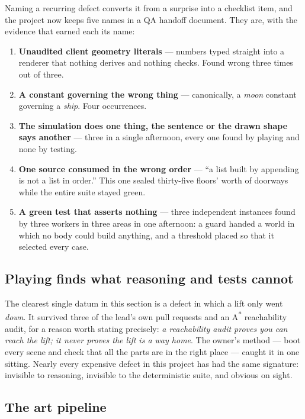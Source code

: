 \documentclass[10pt,twocolumn]{article}
\begin{document}
Naming a recurring defect converts it from a surprise into a checklist item, and the project
now keeps five names in a QA handoff document. They are, with the evidence that earned each
its name:

\begin{enumerate}
  \item \textbf{Unaudited client geometry literals} --- numbers typed straight into a renderer
        that nothing derives and nothing checks. Found wrong three times out of three.
  \item \textbf{A constant governing the wrong thing} --- canonically, a \emph{moon} constant
        governing a \emph{ship}. Four occurrences.
  \item \textbf{The simulation does one thing, the sentence or the drawn shape says another}
        --- three in a single afternoon, every one found by playing and none by testing.
  \item \textbf{One source consumed in the wrong order} --- ``a list built by appending is not
        a list in order.'' This one sealed thirty-five floors' worth of doorways while the
        entire suite stayed green.
  \item \textbf{A green test that asserts nothing} --- three independent instances found by
        three workers in three areas in one afternoon: a guard handed a world in which no
        body could build anything, and a threshold placed so that it selected every case.
\end{enumerate}

\subsection{Playing finds what reasoning and tests cannot}

The clearest single datum in this section is a defect in which a lift only went \emph{down}.
It survived three of the lead's own pull requests and an A\textsuperscript{*} reachability
audit, for a reason worth stating precisely: \emph{a reachability audit proves you can reach
the lift; it never proves the lift is a way home}. The owner's method --- boot every scene and
check that all the parts are in the right place --- caught it in one sitting. Nearly every
expensive defect in this project has had the same signature: invisible to reasoning, invisible
to the deterministic suite, and obvious on sight.

\subsection{The art pipeline}
\label{sec:art}
\end{document}
